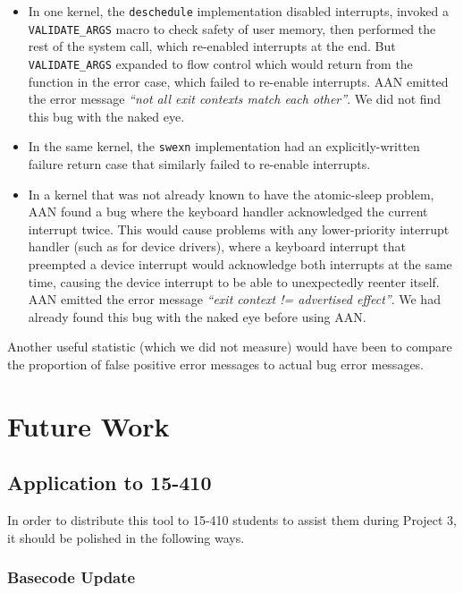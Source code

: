 \documentclass{article}
\begin{document}
\begin{itemize}
	\item In one kernel, the \texttt{deschedule} implementation disabled interrupts, invoked a \texttt{VALIDATE\_ARGS} macro to check safety of user memory, then performed the rest of the system call, which re-enabled interrupts at the end. But \texttt{VALIDATE\_ARGS} expanded to flow control which would return from the function in the error case, which failed to re-enable interrupts. AAN emitted the error message {\em ``not all exit contexts match each other''}. We did not find this bug with the naked eye.
	\item In the same kernel, the \texttt{swexn} implementation had an explicitly-written failure return case that similarly failed to re-enable interrupts.
	\item In a kernel that was not already known to have the atomic-sleep problem, AAN found a bug where the keyboard handler acknowledged the current interrupt twice. This would cause problems with any lower-priority interrupt handler (such as for device drivers), where a keyboard interrupt that preempted a device interrupt would acknowledge both interrupts at the same time, causing the device interrupt to be able to unexpectedly reenter itself. AAN emitted the error message {\em ``exit context != advertised effect''}. We had already found this bug with the naked eye before using AAN.
\end{itemize}

Another useful statistic (which we did not measure) would have been to compare the proportion of false positive error messages to actual bug error messages.


\section{Future Work}

\subsection{Application to 15-410}

In order to distribute this tool to 15-410 students to assist them during Project 3, it should be polished in the following ways.

\subsubsection{Basecode Update}
\end{document}
